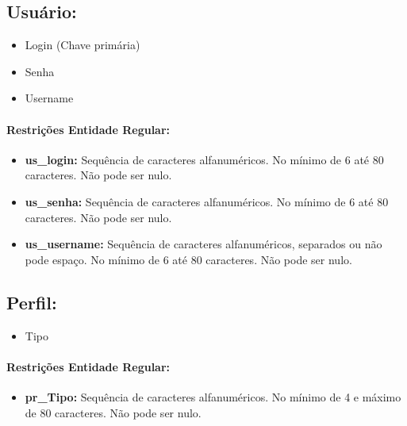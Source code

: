 \documentclass{report}
\begin{document}
\subsection{Usuário:}
\begin{itemize}
  \item Login (Chave primária)
  \item Senha
  \item Username
\end{itemize}

\paragraph{Restrições Entidade Regular:}
\begin{itemize}
  \item \textbf{us\_login:} Sequência de caracteres alfanuméricos. No mínimo de 6 até 80 caracteres. Não pode ser nulo.
  \item \textbf{us\_senha:}  Sequência de caracteres alfanuméricos. No mínimo de 6 até 80 caracteres. Não pode ser nulo.
  \item \textbf{us\_username:} Sequência de caracteres alfanuméricos, separados ou não pode espaço. No mínimo de 6 até 80 caracteres. Não pode ser nulo.
\end{itemize}

\subsection{Perfil:}
\begin{itemize}
  \item Tipo
\end{itemize}
\paragraph{Restrições Entidade Regular:}
\begin{itemize}
  \item \textbf{pr\_Tipo:} Sequência de caracteres alfanuméricos. No mínimo de 4 e máximo de 80 caracteres. Não pode ser nulo.
\end{itemize}
\end{document}
